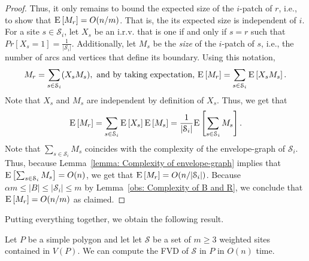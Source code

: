 \documentclass[a4paper,UKenglish]{socg-lipics-v2018}
\newcommand{\icell}[1][i]{${#1}$-patch\xspace}
\newcommand{\s}{\mathcal S}
\newcommand{\ex}[1]{\textsc{E}\left[#1\right]}
\begin{document}
\begin{proof}
Thus, it only remains to bound the expected size of the \icell of $r$, i.e., to show that $\ex{M_r} = O(n/m)$.
That is, the its expected size is independent of $i$.
For a site $s\in \s_i$, let $X_s$ be an i.r.v. that is one if and only if $s = r$ such that $Pr[X_s = 1] = \frac{1}{|\s_i|}$.
Additionally, let $M_s$ be the \emph{size} of the \icell of $s$, i.e., the number of arcs and vertices that define its boundary. 
Using this notation,
\[M_r = \sum_{s\in \s_i} ( X_s M_s), \text{ and by taking expectation, } \ex{M_r} = \sum_{s\in \s_i} \ex{X_s M_s}.\]
Note that $X_s$ and $M_s$ are independent by definition of $X_s$.
Thus, we get that  
\[\ex{M_r} = \sum_{s\in \s_i} \ex{X_s} \ex{M_s} = \frac{1}{|\s_i|} \ex{\sum_{s\in \s_i} M_s}.\]
Note that $\sum_{s\in \s_i} M_s$ coincides with the complexity of the envelope-graph of $\s_i$.
Thus, because Lemma~\ref{lemma: Complexity of envelope-graph} implies that $\ex{\sum_{s\in \s_i} M_s} = O(n)$, we get that  $\ex{M_r} = O(n/|\s_i|)$.
Because $\alpha m \leq |B| \leq |\s_i| \leq m$ by Lemma~\ref{obs: Complexity of B and R}, we conclude that $\ex{M_r} = O(n/m)$ as claimed.
\end{proof}

Putting everything together, we obtain the following result.

\begin{theorem}
Let  $P$ be a simple polygon and let let $\s$ be a set of $m\geq 3$ weighted sites contained in $V(P)$.
We can compute the FVD of $\s$ in $P$ in $O(n)$ time. 
\end{theorem}


\newpage
{\small

}

\end{document}
